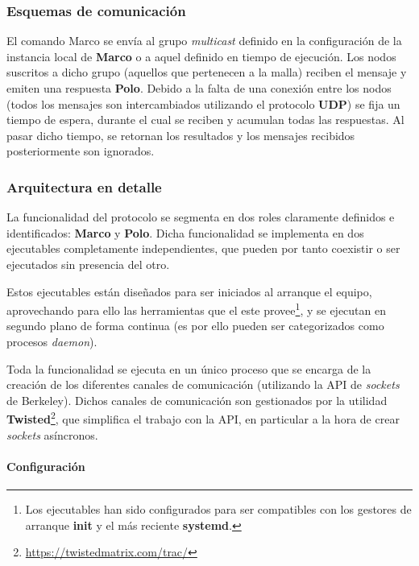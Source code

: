 \subsubsection{Esquemas de comunicación}


El comando Marco se envía al grupo \textit{multicast} definido en la configuración de la instancia local de \textbf{Marco} o a aquel definido en tiempo de ejecución. Los nodos suscritos a dicho grupo (aquellos que pertenecen a la malla) reciben el mensaje y emiten una respuesta \textbf{Polo}. Debido a la falta de una conexión entre los nodos (todos los mensajes son intercambiados utilizando el protocolo \textbf{UDP}) se fija un tiempo de espera, durante el cual se reciben y acumulan todas las respuestas. Al pasar dicho tiempo, se retornan los resultados y los mensajes recibidos posteriormente son ignorados.

\subsubsection{Arquitectura en detalle}

La funcionalidad del protocolo se segmenta en dos roles claramente definidos e identificados: \textbf{Marco} y \textbf{Polo}. Dicha funcionalidad se implementa en dos ejecutables completamente independientes, que pueden por tanto coexistir o ser ejecutados sin presencia del otro.

Estos ejecutables están diseñados para ser iniciados al arranque el equipo, aprovechando para ello las herramientas que el este provee\footnote{Los ejecutables han sido configurados para ser compatibles con los gestores de arranque \textbf{init} y el más reciente \textbf{systemd}.}, y se ejecutan en segundo plano de forma continua (es por ello pueden ser categorizados como procesos \textit{daemon}).

Toda la funcionalidad se ejecuta en un único proceso que se encarga de la creación de los diferentes canales de comunicación (utilizando la API de \textit{sockets} de Berkeley). Dichos canales de comunicación son gestionados por la utilidad \textbf{Twisted}\footnote{\href{https://twistedmatrix.com/trac/}{https://twistedmatrix.com/trac/}}, que simplifica el trabajo con la API, en particular a la hora de crear \textit{sockets} asíncronos.

\paragraph{Configuración\\}

